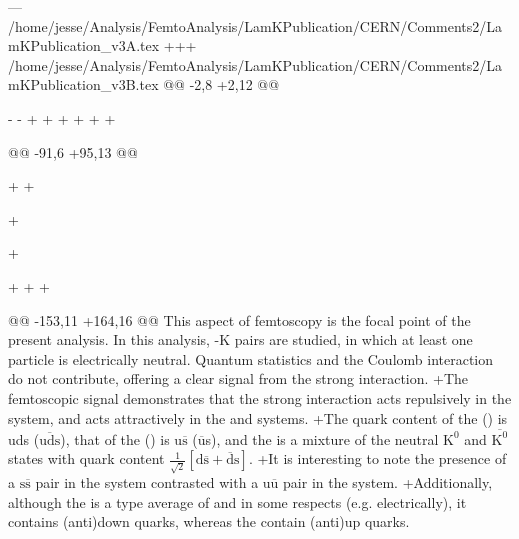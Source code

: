 --- /home/jesse/Analysis/FemtoAnalysis/LamKPublication/CERN/Comments2/LamKPublication_v3A.tex
+++ /home/jesse/Analysis/FemtoAnalysis/LamKPublication/CERN/Comments2/LamKPublication_v3B.tex
@@ -2,8 +2,12 @@
 
 \newcommand{\ResultsDirBase}{/home/jesse/Analysis/FemtoAnalysis/Results/}
-\newcommand{\ResultsDirBaseLamKch}{/home/jesse/Analysis/FemtoAnalysis/Results/Results_cLamcKch_20180505/}
-\newcommand{\ResultsDirBaseLamKs}{/home/jesse/Analysis/FemtoAnalysis/Results/Results_cLamK0_20180505/}
+
+%
+%
+\newcommand{\ResultsDirBaseLamKch}{/home/jesse/Analysis/FemtoAnalysis/Results/Results_cLamcKch_20190319/}
+\newcommand{\ResultsDirBaseLamKs}{/home/jesse/Analysis/FemtoAnalysis/Results/Results_cLamK0_20190319/}
+
 \newcommand{\VZeroEffDirBase}{/home/jesse/Analysis/FemtoAnalysis/Results/V0Efficiency/}
 
 \newcommand{\MomRes}{_MomResCrctn}%
@@ -91,6 +95,13 @@
 \usepackage{pdflscape}
 
 \usepackage{comment}
+
+\usepackage{subfiles}
+\usepackage{chngpage}  %
+\usepackage{boldline}  %
+                       %
+                       %
+\usepackage{arrayjobx} %
 
 \usepackage{relsize} %
 \usepackage{scalerel}  %
@@ -153,11 +164,16 @@
 This aspect of femtoscopy is the focal point of the present analysis. 
 In this analysis, \Lam-K pairs are studied, in which at least one particle is electrically neutral.  
 Quantum statistics and the Coulomb interaction do not contribute, offering a clear signal from the strong interaction.
+The femtoscopic signal demonstrates that the strong interaction acts repulsively in the \LamKchP system, and acts attractively in the \LamKchM and \LamKs systems.
+The quark content of the \Lam (\ALam) is uds ($\overline{\mathrm{uds}}$), that of the \KchP (\KchM) is u$\overline{\mathrm{s}}$ ($\overline{\mathrm{u}}$s), and the \Ks is a mixture of the neutral $\mathrm{K}^{0}$ and $\overline{\mathrm{K}^{0}}$ states with quark content $\frac{1}{\sqrt{2}}\left[\mathrm{d\overline{s} + \overline{d}s}\right]$.
+It is interesting to note the presence of a $\mathrm{s\overline{s}}$ pair in the \LamKchP system contrasted with a $\mathrm{u\overline{u}}$ pair in the \LamKchM system.
+Additionally, although the \Ks is a type average of \KchP and \KchM in some respects (e.g. electrically), it contains (anti)down quarks, whereas the \Kpm contain (anti)up quarks.
 
